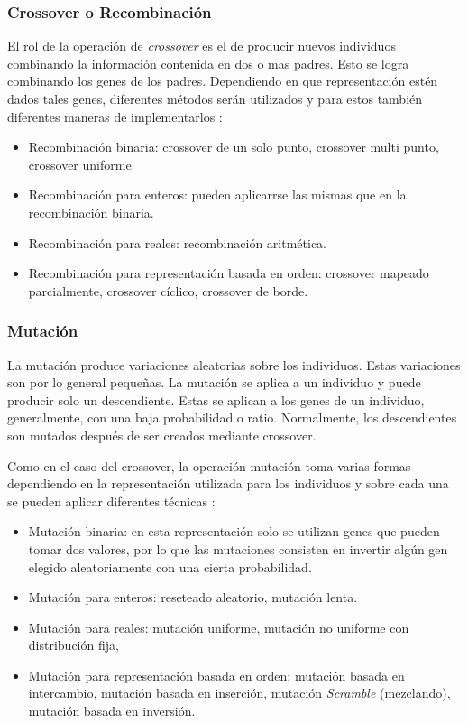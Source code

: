 \subsubsection{Crossover o Recombinación}
El rol de la operación de \emph{crossover} es el de producir nuevos individuos combinando la información contenida en dos o mas padres. Esto se logra combinando los genes de los padres. Dependiendo en que representación estén dados tales genes, diferentes métodos serán utilizados y para estos también diferentes maneras de implementarlos \cite{grosan2011intelligent}: 

\begin{itemize}
    \item Recombinación binaria: crossover de un solo punto, crossover multi punto, crossover uniforme.
    \item Recombinación para enteros: pueden aplicarrse las mismas que en la recombinación binaria.
    \item Recombinación para reales: recombinación aritmética.
    \item Recombinación para representación basada en orden:  crossover mapeado parcialmente, crossover cíclico, crossover de borde.
\end{itemize}

\subsubsection{Mutación}
La mutación produce variaciones aleatorias sobre los individuos. Estas variaciones son por lo general pequeñas. La mutación se aplica a un individuo y puede producir solo un descendiente. Estas se aplican a los genes de un individuo, generalmente, con una baja probabilidad o ratio. Normalmente, los descendientes son mutados después de ser creados mediante crossover.

Como en el caso del crossover, la operación mutación toma varias formas dependiendo en la representación utilizada para los individuos y sobre cada una se pueden aplicar diferentes técnicas \cite{grosan2011intelligent}:

\begin{itemize}
    \item Mutación binaria: en esta representación solo se utilizan genes que pueden tomar dos valores, por lo que las mutaciones consisten en invertir algún gen elegido aleatoriamente con una cierta probabilidad.
    \item Mutación para enteros: reseteado aleatorio, mutación lenta.
    \item Mutación para reales: mutación uniforme, mutación no uniforme con distribución fija, 
    \item Mutación para representación basada en orden: mutación basada en intercambio, mutación basada en inserción, mutación \emph{Scramble} (mezclando), mutación basada en inversión.
\end{itemize}


